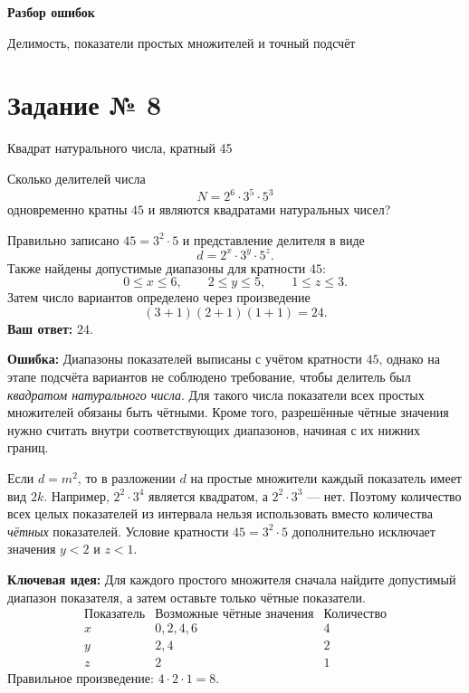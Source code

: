 \documentclass[a4paper,11pt]{article}
\newcommand{\subhead}[1]{\par\vspace{3pt}{\bfseries\textcolor{ink}{#1}}\par\vspace{1pt}}
\newcommand{\errorlabel}{\textcolor{warn}{\textbf{Ошибка:}}}
\newcommand{\keylabel}{\textcolor{keyblue}{\textbf{Ключевая идея:}}}
\newcommand{\tasktitle}[2]{\phantomsection\label{task:#1}\section*{Задание № #1}\textcolor{muted}{#2}\par\vspace{4pt}}
\begin{document}
\clearpage
\thispagestyle{empty}
\vspace*{0.34\textheight}
\begin{center}
{\Huge\bfseries\color{ink}Разбор ошибок}\par
\vspace{8mm}
{\large\textcolor{muted}{Делимость, показатели простых множителей и точный подсчёт}}\par
\end{center}

\clearpage
{\small\setlength{\parskip}{2pt}
\tasktitle{8}{Квадрат натурального числа, кратный 45}
\subhead{Текст задания}
Сколько делителей числа
\[
N=2^6\cdot3^5\cdot5^3
\]
одновременно кратны $45$ и являются квадратами натуральных чисел?

\subhead{Ваше решение}
Правильно записано $45=3^2\cdot5$ и представление делителя в виде
\[
d=2^x\cdot3^y\cdot5^z.
\]
Также найдены допустимые диапазоны для кратности $45$:
\[
0\le x\le6,\qquad 2\le y\le5,\qquad1\le z\le3.
\]
Затем число вариантов определено через произведение
\[
(3+1)(2+1)(1+1)=24.
\]
\textbf{Ваш ответ:} $24$.

\subhead{Где именно возникает ошибка}
\errorlabel{} Диапазоны показателей выписаны с учётом кратности $45$, однако на этапе подсчёта вариантов не соблюдено требование, чтобы делитель был \emph{квадратом натурального числа}. Для такого числа показатели всех простых множителей обязаны быть чётными. Кроме того, разрешённые чётные значения нужно считать внутри соответствующих диапазонов, начиная с их нижних границ.

\subhead{Почему это неверно}
Если $d=m^2$, то в разложении $d$ на простые множители каждый показатель имеет вид $2k$. Например, $2^2\cdot3^4$ является квадратом, а $2^2\cdot3^3$ --- нет. Поэтому количество всех целых показателей из интервала нельзя использовать вместо количества \emph{чётных} показателей. Условие кратности $45=3^2\cdot5$ дополнительно исключает значения $y<2$ и $z<1$.

\subhead{Ключевая идея и исправление}
\keylabel{} Для каждого простого множителя сначала найдите допустимый диапазон показателя, а затем оставьте только чётные показатели.
\[
\begin{array}{c|c|c}
\text{Показатель}&\text{Возможные чётные значения}&\text{Количество}\\\hline
x&0,2,4,6&4\\
y&2,4&2\\
z&2&1
\end{array}
\]
Правильное произведение: $4\cdot2\cdot1=8$.

}
\end{document}
